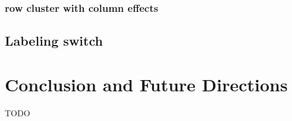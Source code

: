 \documentclass{article}
\begin{document}
\subsubsection{row cluster with column effects}


\subsection{Labeling switch}

\section{Conclusion and Future Directions}

TODO

\printbibliography
\end{document}
